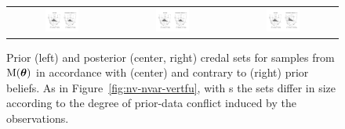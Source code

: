 \begin{figure}
\begin{tabular}{ccc}%
\hspace*{-1.2ex}%
\includegraphics[trim =  20mm 25mm 150mm 20mm, clip, width=0.33\textwidth]{fig/jstp-paper_idm_nvar_zeile1-080331}%
\hspace*{-1.2ex}%
&%
\hspace*{-1.2ex}%
\includegraphics[trim = 150mm 25mm  20mm 20mm, clip, width=0.33\textwidth]{fig/jstp-paper_idm_nvar_zeile1-080331}%
\hspace*{-1.2ex}%
&%
\hspace*{-1.2ex}%
\includegraphics[trim = 150mm 25mm  20mm 20mm, clip, width=0.33\textwidth]{fig/jstp-paper_idm_nvar_zeile2-081205}%
\hspace*{-1.2ex}%
\end{tabular}%
\caption[Generalised \ymodel\ for samples from $\mult(\btheta)$:
prior and posterior credal sets for data in accordance with and contrary to prior beliefs.]%
{Prior (left) and posterior (center, right) credal sets for samples from
$\mult(\btheta)$ in accordance with (center) and contrary to (right)
prior beliefs. As in Figure~\ref{fig:nv-nvar-vertfu}, with \nymodel s
the sets differ in size according to the degree of prior-data conflict
induced by the observations.
}
\label{fig:idm-nvar-nopdc}
\end{figure}


